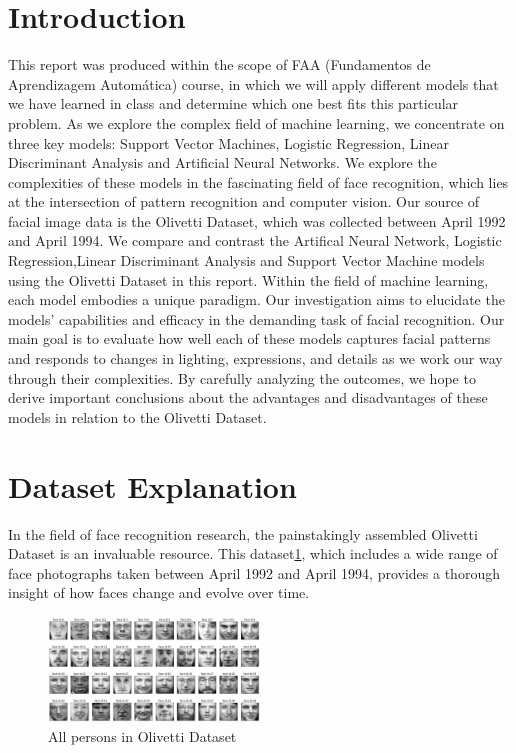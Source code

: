 \documentclass[12pt,a4paper,twocolumn]{article}
\begin{document}
\section{Introduction}
This report was produced within the scope of FAA (Fundamentos de Aprendizagem Automática) course, in which we will apply different models that we have learned in class and determine which one best fits this particular problem. As we explore the complex field of machine learning, we concentrate on three key models: Support Vector Machines, Logistic Regression, Linear Discriminant Analysis and  Artificial Neural Networks.
We explore the complexities of these models in the fascinating field of face recognition, which lies at the intersection of pattern recognition and computer vision. Our source of facial image data is the Olivetti Dataset, which was collected between April 1992 and April 1994.
We compare and contrast the Artifical Neural Network, Logistic Regression,Linear Discriminant Analysis and  Support Vector Machine models using the Olivetti Dataset in this report. Within the field of machine learning, each model embodies a unique paradigm. Our investigation aims to elucidate the models' capabilities and efficacy in the demanding task of facial recognition.
Our main goal is to evaluate how well each of these models captures facial patterns and responds to changes in lighting, expressions, and details as we work our way through their complexities. By carefully analyzing the outcomes, we hope to derive important conclusions about the advantages and disadvantages of these models in relation to the Olivetti Dataset.

\section{Dataset Explanation}
In the field of face recognition research, the painstakingly assembled Olivetti Dataset is an invaluable resource. This dataset\ref{fig:Dataset Images}, which includes a wide range of face photographs taken between April 1992 and April 1994, provides a thorough insight of how faces change and evolve over time.

\begin{figure}[ht!]
\centering
\includegraphics[width=0.5\textwidth]{images2/allimages.png}

\caption{\label{fig:Dataset Images} 
All persons in Olivetti Dataset}
\end{figure}
\end{document}
